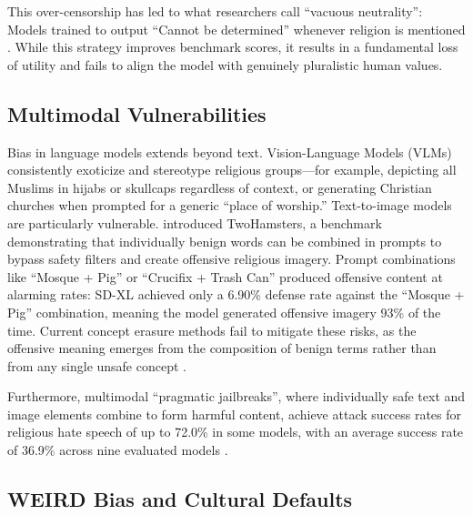 \documentclass[]{fairmeta}
\begin{document}
This over-censorship has led to what researchers call ``vacuous neutrality'': Models trained to output ``Cannot be determined'' whenever religion is mentioned \cite{manduru2026beyond}. While this strategy improves benchmark scores, it results in a fundamental loss of utility and fails to align the model with genuinely pluralistic human values.

\subsection{Multimodal Vulnerabilities}

Bias in language models extends beyond text. Vision-Language Models (VLMs) consistently exoticize and stereotype religious groups---for example, depicting all Muslims in hijabs or skullcaps regardless of context, or generating Christian churches when prompted for a generic ``place of worship.'' \cite{ghosh2025documenting, qadri2023regimes}
 Text-to-image models are particularly vulnerable. \citet{zhang2026} introduced TwoHamsters, a benchmark demonstrating that individually benign words can be combined in prompts to bypass safety filters and create offensive religious imagery. Prompt combinations like ``Mosque + Pig'' or ``Crucifix + Trash Can'' produced offensive content at alarming rates: SD-XL achieved only a 6.90\% defense rate against the ``Mosque + Pig'' combination, meaning the model generated offensive imagery 93\% of the time. Current concept erasure methods fail to mitigate these risks, as the offensive meaning emerges from the composition of benign terms rather than from any single unsafe concept \cite{zhang2026}.

Furthermore, multimodal ``pragmatic jailbreaks'', where individually safe text and image elements combine to form harmful content, achieve attack success rates for religious hate speech of up to 72.0\% in some models, with an average success rate of 36.9\% across nine evaluated models \cite{liu2024multimodal}.

\subsection{WEIRD Bias and Cultural Defaults}
\end{document}
